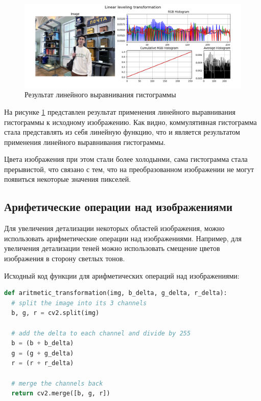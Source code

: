 \documentclass[a4paper, 12pt]{extarticle}
\begin{document}
\begin{figure}[h]
    \centering
    \includegraphics[width=\textwidth]{../results/Linear leveling transformation.png}
    \caption{Результат линейного выравнивания гистограммы}
    \label{fig:linear}
\end{figure}

На рисунке \ref{fig:linear} представлен результат применения линейного выравнивания гистограммы к исходному изображению. Как видно, коммулятивная гистограмма стала представлять из себя линейную функцию, что и является результатом применения линейного выравнивания гистограммы. 

Цвета изображения при этом стали более холодынми, сама гистограмма стала прерывистой, что связано с тем, что на преобразованном изображении не могут появиться некоторые значения пикселей. 

\subsection{Арифетические операции над изображениями}

Для увеличения детализации некоторых областей изображения, можно использовать арифметические операции над изображениями. Например, для увеличения детализации теней можно использовать смещение цветов изображения в сторону светлых тонов.

Исходный код функции для арифметических операций над изображениями:

\begin{lstlisting}[language=Python]
def aritmetic_transformation(img, b_delta, g_delta, r_delta):
  # split the image into its 3 channels
  b, g, r = cv2.split(img)

  # add the delta to each channel and divide by 255
  b = (b + b_delta) 
  g = (g + g_delta) 
  r = (r + r_delta) 

  # merge the channels back
  return cv2.merge([b, g, r])
\end{lstlisting}
\end{document}
